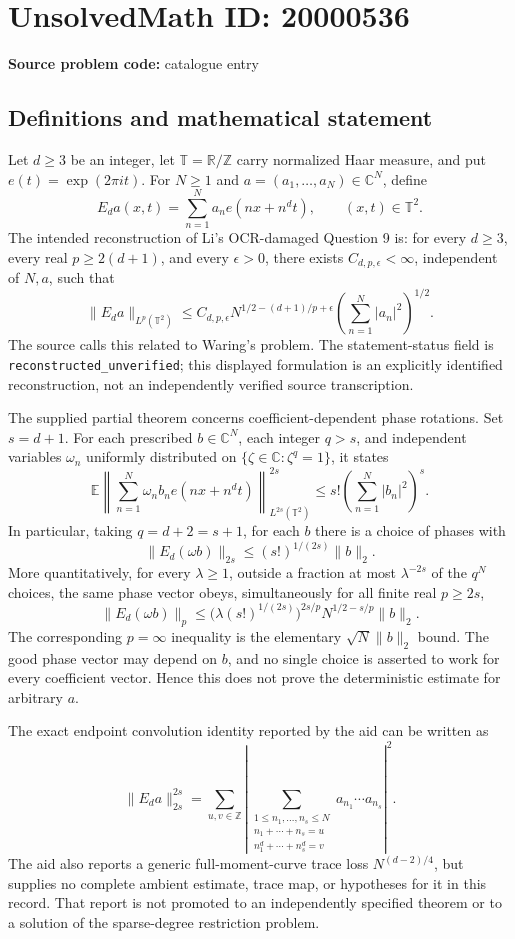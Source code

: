 \documentclass[11pt]{article}
\newcommand{\Z}{\mathbb{Z}}
\newcommand{\R}{\mathbb{R}}
\newcommand{\C}{\mathbb{C}}
\newcommand{\E}{\mathbb{E}}
\begin{document}
\section*{UnsolvedMath ID: 20000536}
\textbf{Source problem code:} catalogue entry
\subsection{Definitions and mathematical statement}
Let \(d\geq3\) be an integer, let \(\mathbb T=\R/\Z\) carry normalized Haar measure, and put \(e(t)=\exp(2\pi i t)\). For \(N\geq1\) and \(a=(a_1,\ldots,a_N)\in\C^N\), define
\[
 E_da(x,t)=\sum_{n=1}^N a_n e(nx+n^d t),\qquad (x,t)\in\mathbb T^2.
\]
The intended reconstruction of Li's OCR-damaged Question 9 is: for every \(d\geq3\), every real \(p\geq2(d+1)\), and every \(\epsilon>0\), there exists \(C_{d,p,\epsilon}<\infty\), independent of \(N,a\), such that
\[
 \|E_da\|_{L^p(\mathbb T^2)}\leq C_{d,p,\epsilon}
 N^{1/2-(d+1)/p+\epsilon}\left(\sum_{n=1}^N|a_n|^2\right)^{1/2}.
\]
The source calls this related to Waring's problem. The statement-status field is \texttt{reconstructed\_unverified}; this displayed formulation is an explicitly identified reconstruction, not an independently verified source transcription.

The supplied partial theorem concerns coefficient-dependent phase rotations. Set \(s=d+1\). For each prescribed \(b\in\C^N\), each integer \(q>s\), and independent variables \(\omega_n\) uniformly distributed on \(\{\zeta\in\C:\zeta^q=1\}\), it states
\[
 \E\left\|\sum_{n=1}^N\omega_n b_n e(nx+n^d t)\right\|_{L^{2s}(\mathbb T^2)}^{2s}
 \leq s!\left(\sum_{n=1}^N|b_n|^2\right)^s.
\]
In particular, taking \(q=d+2=s+1\), for each \(b\) there is a choice of phases with
\[
 \|E_d(\omega b)\|_{2s}\leq(s!)^{1/(2s)}\|b\|_2.
\]
More quantitatively, for every \(\lambda\geq1\), outside a fraction at most \(\lambda^{-2s}\) of the \(q^N\) choices, the same phase vector obeys, simultaneously for all finite real \(p\geq2s\),
\[
 \|E_d(\omega b)\|_p\leq
 \bigl(\lambda(s!)^{1/(2s)}\bigr)^{2s/p}
 N^{1/2-s/p}\|b\|_2.
\]
The corresponding \(p=\infty\) inequality is the elementary \(\sqrt N\|b\|_2\) bound. The good phase vector may depend on \(b\), and no single choice is asserted to work for every coefficient vector. Hence this does not prove the deterministic estimate for arbitrary \(a\).

The exact endpoint convolution identity reported by the aid can be written as
\[
 \|E_da\|_{2s}^{2s}
 =\sum_{u,v\in\Z}\left|
 \sum_{\substack{1\leq n_1,\ldots,n_s\leq N\\
 n_1+\cdots+n_s=u\\ n_1^d+\cdots+n_s^d=v}}
 a_{n_1}\cdots a_{n_s}\right|^2.
\]
The aid also reports a generic full-moment-curve trace loss \(N^{(d-2)/4}\), but supplies no complete ambient estimate, trace map, or hypotheses for it in this record. That report is not promoted to an independently specified theorem or to a solution of the sparse-degree restriction problem.
\end{document}

